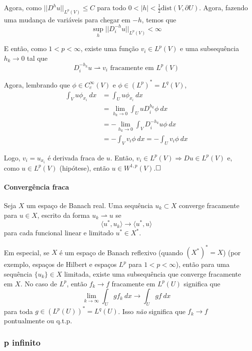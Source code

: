 \documentclass[a4paper, 11pt]{article}
\newcommand{\qed}{$\hfill\square$}
\begin{document}
\begin{enumerate}[(i)]
	Agora, como $||D^h u||_{L^p(V)}\leq C$ para todo $0<|h|<\frac{1}{2}\text{dist}(V, \partial U)$. Agora, fazendo uma mudança de variáveis para chegar em $-h$, temos que
	\[ \sup_h ||D_i^{-h} u ||_{L^p(V)} < \infty \]

	E então, como $1<p<\infty$, existe uma função $v_i \in L^p(V)$ e uma subsequência $h_k \rightarrow 0$ tal que \[ D_i^{-h_k}u  \rightharpoonup v_i \text{ fracamente em } L^p(V)\]

	Agora, lembrando que $\phi \in C^\infty_c(V)$ e $\phi \in (L^p)^* = L^q(V)$, \begin{align*}
		\int_V u \phi_{x_i}\ dx &= \int_U u \phi_{x_i}\ dx \\ &= \lim_{h_k \rightarrow 0} \int_U u D_i^{h_k}\phi \ dx\\
		&= - \lim_{h_k\rightarrow 0} \int_V D_i^{-h_k}u \phi \ dx \\
		&= - \int_V v_i \phi \ dx = - \int_U v_i \phi \ dx
	\end{align*}

	Logo, $v_i = u_{x_i}$ é derivada fraca de $u$. Então, $v_i \in L^p(V) \Rightarrow Du \in L^p(V)$ e, como $u \in L^p(V)$ (hipótese), então $u \in W^{1,p}(V)$.\qed

\end{enumerate}

\paragraph{Convergência fraca}\label{def:convergencia-fraca} Seja $X$ um espaço de Banach real. Uma sequência ${u_k} \subset X$ converge fracamente para $u \in X$, escrito da forma $u_k \rightharpoonup u$ se \[ \langle u^*, u_k \rangle \rightarrow \langle u^*, u \rangle \] para cada funcional linear e limitado $u^* \in X^*$.

Em especial, se $X$ é um espaço de Banach reflexivo (quando $(X^*)^*=X$) (por exemplo, espaços de Hilbert e espaços $L^p$ para $1<p<\infty$), então para uma sequência $\{u_k\}\in X$ limitada, existe uma subsequência que converge fracamente em $X$. No caso de $L^p$, então $f_k \rightarrow f$ fracamente em $L^p(U)$ significa que \[\lim_{k\rightarrow\infty}\int_U g f_k\ dx \rightarrow \int_U gf\ dx \] para toda $g \in (L^p(U))^* = L^q(U)$. Isso \textit{não} significa que $f_k\rightarrow f$ pontualmente ou q.t.p.

\subsubsection{p infinito}
\end{document}
